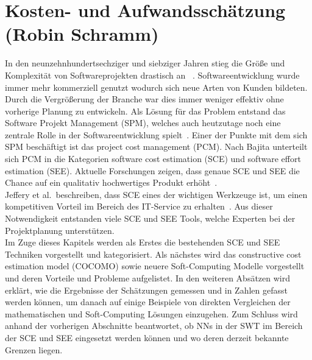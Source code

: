 \section[Kosten- und Aufwandsschätzung (Robin Schramm)]{\large  Kosten- und Aufwandsschätzung (Robin Schramm)} \label{KostenAufwand}
In den neunzehnhundertsechziger und siebziger Jahren stieg die Größe und Komplexität von Softwareprojekten drastisch an ~\cite{Bajta2018}. Softwareentwicklung wurde immer mehr kommerziell genutzt wodurch sich neue Arten von Kunden bildeten. Durch die Vergrößerung der Branche war dies immer weniger effektiv ohne vorherige Planung zu entwickeln. Als Lösung für das Problem entstand das Software Projekt Management (SPM), welches auch heutzutage noch eine zentrale Rolle in der Softwareentwicklung spielt~\cite{Bajta2018}. Einer der Punkte mit dem sich SPM beschäftigt ist das project cost management (PCM). Nach Bajita \cite{Bajta2018} unterteilt sich PCM in die Kategorien software cost estimation (SCE) und software effort estimation (SEE). Aktuelle Forschungen zeigen, dass genaue SCE und SEE die Chance auf ein qualitativ hoch\-wertiges Produkt erhöht~\cite{Matson1994}\cite{Bilgaiyan2016}.\\
Jeffery et al.~beschreiben, dass SCE eines der wichtigen Werkzeuge ist, um einen kompetitiven Vorteil im Bereich des IT-Service zu erhalten~\cite{Jeffery1990}. Aus dieser Notwendigkeit entstanden viele SCE und SEE Tools, welche Experten bei der Projektplanung unterstützen.
\\
Im Zuge dieses Kapitels werden als Erstes die bestehenden SCE und SEE Techniken vorgestellt und kategorisiert. Als nächstes wird das constructive cost estimation model (COCOMO) sowie neuere Soft-Computing Modelle vorgestellt und deren Vorteile und Probleme aufgelistet. In den weiteren Absätzen wird erklärt, wie die Ergebnisse der Schätzungen gemessen und in Zahlen  gefasst werden können, um danach auf einige Beispiele von direkten Vergleichen der mathematischen und Soft-Computing Lösungen einzugehen. Zum Schluss wird anhand der vorherigen Abschnitte beantwortet, ob NNs in der SWT im Bereich der SCE und SEE eingesetzt werden können und wo deren derzeit bekannte Grenzen liegen.


